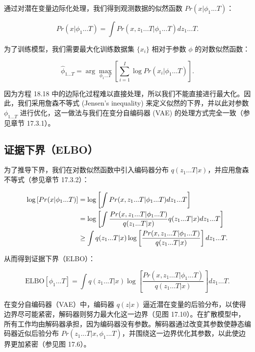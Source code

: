 \documentclass[lang=cn,newtx,10pt,scheme=chinese]{elegantbook}
\begin{document}
通过对潜在变量边际化处理，我们得到观测数据的似然函数 \(Pr(x|\phi_1...T)\)：

\begin{equation}
Pr(x|\phi_1...T) = \int Pr(x, z_1...T|\phi_1...T)dz_1...T. 
\end{equation}

为了训练模型，我们需要最大化训练数据集 \(\{x_i\}\) 相对于参数 \(\phi\) 的对数似然函数：

\begin{equation}
\hat{\phi}_{1...T} = \arg\max_{\phi_1...T} \left[ \sum_{i=1}^{I} \log Pr(x_i|\phi_1...T) \right]. 
\end{equation}

因为方程 18.18 中的边际化过程难以直接处理，所以我们不能直接进行最大化。因此，我们采用詹森不等式 (Jensen's inequality) 来定义似然的下界，并以此对参数 \(\phi_{1...T}\) 进行优化，这一做法与我们在变分自编码器 (VAE) 的处理方式完全一致（参见章节 17.3.1）。

\subsection{证据下界（ELBO）}
为了推导下界，我们在对数似然函数中引入编码器分布 \(q(z_1...T|x)\)，并应用詹森不等式（参见章节 17.3.2）：


\begin{align}
\log \left[ Pr(x|\phi_1...T) \right] &= \log \left[ \int Pr(x, z_1...T|\phi_1...T)dz_1...T \right] \notag \\
&= \log \left[ \int \frac{Pr(x, z_1...T|\phi_1...T)}{q(z_1...T|x)} q(z_1...T|x) dz_1...T \right]  \notag \\
&\geq \int q(z_1...T|x) \log \left[ \frac{Pr(x, z_1...T|\phi_1...T)}{q(z_1...T|x)} \right] dz_1...T. 
\end{align} 


从而得到证据下界（ELBO）：

\begin{equation}
\text{ELBO}[\phi_1...T] = \int q(z_1...T|x) \log \left[ \frac{Pr(x, z_1...T|\phi_1...T)}{q(z_1...T|x)} \right] dz_1...T. 
\end{equation}

在变分自编码器（VAE）中，编码器 \(q(z|x)\) 逼近潜在变量的后验分布，以使得边界尽可能紧密，解码器则努力最大化这一边界（见图 17.10）。在扩散模型中，所有工作均由解码器承担，因为编码器没有参数。解码器通过改变其参数使静态编码器近似后验分布 \(Pr(z_1...T|x, \phi_1...T)\)，并围绕这一边界优化其参数，以此使边界更加紧密（参见图 17.6）。
\end{document}
